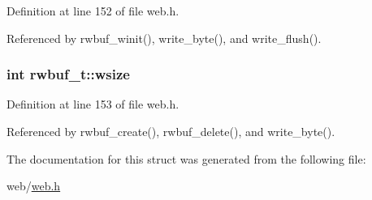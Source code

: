 Definition at line 152 of file web.\-h.



Referenced by rwbuf\-\_\-winit(), write\-\_\-byte(), and write\-\_\-flush().

\hypertarget{structrwbuf__t_ac723cf150dd35d0f67ba7d38b18863ad}{
\subsubsection[{wsize}]{\setlength{\rightskip}{0pt plus 5cm}int rwbuf\-\_\-t\-::wsize}}\label{structrwbuf__t_ac723cf150dd35d0f67ba7d38b18863ad}


Definition at line 153 of file web.\-h.



Referenced by rwbuf\-\_\-create(), rwbuf\-\_\-delete(), and write\-\_\-byte().



The documentation for this struct was generated from the following file\-:\begin{DoxyCompactItemize}
\item 
web/\hyperlink{web_8h}{web.\-h}\end{DoxyCompactItemize}
